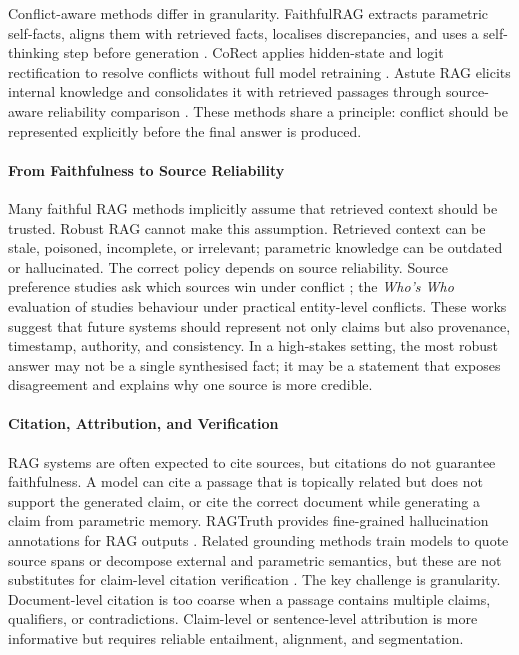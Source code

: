 Conflict-aware methods differ in granularity. FaithfulRAG extracts parametric self-facts, aligns them with retrieved facts, localises discrepancies, and uses a self-thinking step before generation \citep{faithfulRAG2025}. CoRect applies hidden-state and logit rectification to resolve conflicts without full model retraining \citep{rrag008}. Astute RAG elicits internal knowledge and consolidates it with retrieved passages through source-aware reliability comparison \citep{astuteRAG2025}. These methods share a principle: conflict should be represented explicitly before the final answer is produced.

\paragraph{From Faithfulness to Source Reliability}

Many faithful RAG methods implicitly assume that retrieved context should be trusted. Robust RAG cannot make this assumption. Retrieved context can be stale, poisoned, incomplete, or irrelevant; parametric knowledge can be outdated or hallucinated. The correct policy depends on source reliability. Source preference studies ask which sources win under conflict \citep{rrag132}; the \emph{Who's Who} evaluation of \citet{rrag110} studies behaviour under practical entity-level conflicts. These works suggest that future systems should represent not only claims but also provenance, timestamp, authority, and consistency. In a high-stakes setting, the most robust answer may not be a single synthesised fact; it may be a statement that exposes disagreement and explains why one source is more credible.

\paragraph{Citation, Attribution, and Verification}

RAG systems are often expected to cite sources, but citations do not guarantee faithfulness. A model can cite a passage that is topically related but does not support the generated claim, or cite the correct document while generating a claim from parametric memory. RAGTruth provides fine-grained hallucination annotations for RAG outputs \citep{ragTruth2024}. Related grounding methods train models to quote source spans or decompose external and parametric semantics, but these are not substitutes for claim-level citation verification \citep{rrag115,rrag206}. The key challenge is granularity. Document-level citation is too coarse when a passage contains multiple claims, qualifiers, or contradictions. Claim-level or sentence-level attribution is more informative but requires reliable entailment, alignment, and segmentation.

